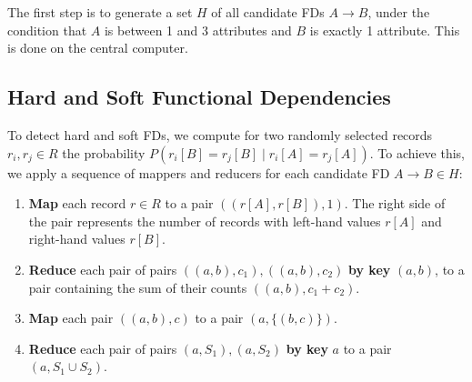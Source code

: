 \documentclass{article}
\begin{document}
    The first step is to generate a set $H$ of all candidate FDs $A \rightarrow B$, under the condition that $A$ is between 1 and 3 attributes and $B$ is exactly 1 attribute. This is done on the central computer.
    
    \subsection{Hard and Soft Functional Dependencies}
    
    To detect hard and soft FDs, we compute for two randomly selected records $r_i, r_j \in R$ the probability $P(r_i[B] = r_j[B] \;|\; r_i[A] = r_j[A])$. To achieve this, we apply a sequence of mappers and reducers for each candidate FD $A \rightarrow B \in H$:
    
    \begin{enumerate}
        \item \textbf{Map} each record $r \in R$ to a pair $((r[A], r[B]), 1)$. The right side of the pair represents the number of records with left-hand values $r[A]$ and right-hand values $r[B]$.
        
        
        \item \textbf{Reduce} each pair of pairs $((a, b), c_1), ((a, b), c_2)$ \textbf{by key} $(a, b)$, to a pair containing the sum of their counts $((a, b), c_1 + c_2)$.
        
        \item \textbf{Map} each pair $((a, b), c)$ to a pair $(a, \{(b, c)\})$.
        
        \item \textbf{Reduce} each pair of pairs $(a, S_1), (a, S_2)$ \textbf{by key} $a$ to a pair $(a, S_1 \cup S_2)$.
        
        

\end{enumerate}
\end{document}
